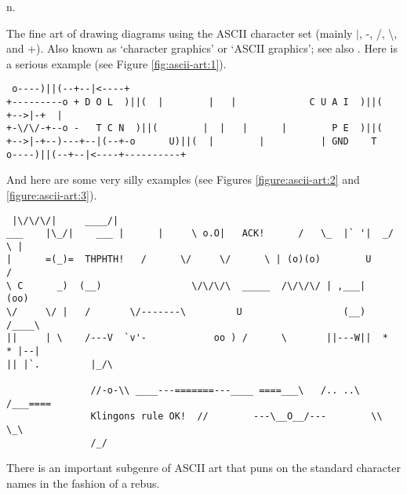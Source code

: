 n.

The fine art of drawing diagrams using the ASCII character set (mainly
$\left|\right.$, -, /, \textbackslash, and +). Also known as `character
graphics' or `ASCII graphics'; see also . Here is a serious
example (see Figure \ref{fig:ascii-art:1}).

\begin{figure*} \begin{shaded} \begin{verbatim} o----)||(--+--|<----+
+---------o + D O L  )||(  |        |   |             C U A I  )||(  +-->|-+  |
+-\/\/-+--o -   T C N  )||(        |  |   |      |        P E  )||(
+-->|-+--)---+--|(--+-o      U)||(  |        |          | GND    T
o----)||(--+--|<----+----------+\end{verbatim} \end{shaded} \caption{A power
supply consisting of a full wave rectifier circuit feeding a capacitor input
filter circuit} \label{fig:ascii-art:1} \end{figure*}

And here are some very silly examples (see Figures \ref{figure:ascii-art:2} and
\ref{figure:ascii-art:3}).

\begin{figure*} \begin{shaded} \begin{verbatim} |\/\/\/|     ____/|
___    |\_/|    ___ |      |     \ o.O|   ACK!      /   \_  |` '|  _/   \ |
|      =(_)=  THPHTH!   /      \/     \/      \ | (o)(o)        U             /
\ C      _)  (__)                \/\/\/\  _____  /\/\/\/ | ,___|    (oo)
\/     \/ |   /       \/-------\         U                  (__) /____\
||     | \    /---V  `v'-            oo ) /      \       ||---W||  *  * |--|
|| |`.         |_/\

			   //-o-\\ ____---=======---____ ====___\   /.. ..\   /___====
			   Klingons rule OK!  //        ---\__O__/---        \\ \_\
			   /_/\end{verbatim} \end{shaded} \caption{A silly ASCII art
			   example} \label{figure:ascii-art:2} \end{figure*}

There is an important subgenre of ASCII art that puns on the standard character
names in the fashion of a rebus.


